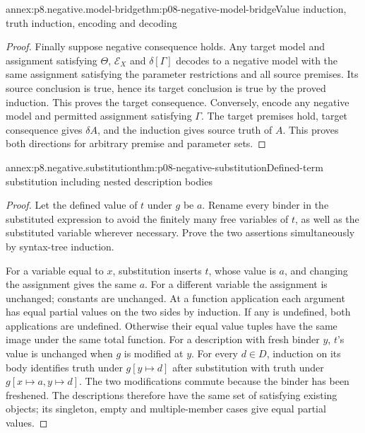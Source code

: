 \begin{annexitem}{annex:p8.negative.model-bridge}{thm:p08-negative-model-bridge}{Value induction, truth induction, encoding and decoding}
\begin{proof}
Finally suppose negative consequence holds.  Any target model and
assignment satisfying \(\Theta\), \(\mathcal E_X\) and
\(\delta[\Gamma]\) decodes to a negative model with the same assignment
satisfying the parameter restrictions and all source premises.  Its
source conclusion is true, hence its target conclusion is true by the
proved induction.  This proves the target consequence.  Conversely,
encode any negative model and permitted assignment satisfying
\(\Gamma\).  The target premises hold, target consequence gives
\(\delta A\), and the induction gives source truth of \(A\).
This proves both directions for arbitrary premise and parameter sets.
\end{proof}
\end{annexitem}

\begin{annexitem}{annex:p8.negative.substitution}{thm:p08-negative-substitution}{Defined-term substitution including nested description bodies}
\begin{proof}
Let the defined value of \(t\) under \(g\) be \(a\).  Rename every binder
in the substituted expression to avoid the finitely many free variables of
\(t\), as well as the substituted variable wherever necessary.  Prove
the two assertions simultaneously by syntax-tree induction.

For a variable equal to \(x\), substitution inserts \(t\), whose value
is \(a\), and changing the assignment gives the same \(a\).  For a
different variable the assignment is unchanged; constants are unchanged.
At a function application each argument has equal partial values on the
two sides by induction.  If any is undefined, both applications are
undefined.  Otherwise their equal value tuples have the same image
under the same total function.  For a description with fresh binder
\(y\), \(t\)'s value is unchanged when \(g\) is modified at \(y\).
For every \(d\in D\), induction on its body identifies truth under
\(g[y\mapsto d]\) after substitution with truth under
\(g[x\mapsto a,y\mapsto d]\).  The two modifications commute because
the binder has been freshened.  The descriptions therefore have the
same set of satisfying existing objects; its singleton, empty and
multiple-member cases give equal partial values.


\end{proof}
\end{annexitem}
